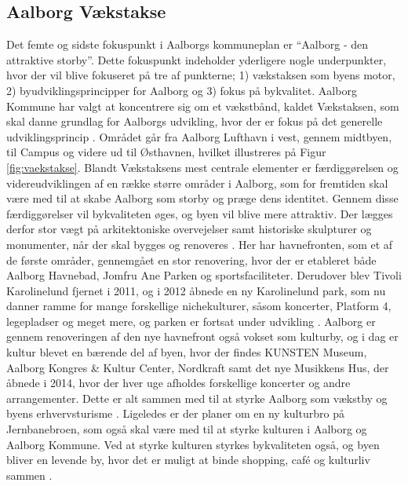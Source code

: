 \subsection{Aalborg Vækstakse}
Det femte og sidste fokuspunkt i Aalborgs kommuneplan er “Aalborg - den attraktive storby”. Dette fokuspunkt indeholder yderligere nogle underpunkter, hvor der vil blive fokuseret på tre af punkterne; 1) vækstaksen som byens motor, 2) byudviklingsprincipper for Aalborg og 3) fokus på bykvalitet. 
\newline
\newline
Aalborg Kommune har valgt at koncentrere sig om et vækstbånd, kaldet Vækstaksen, som skal danne grundlag for Aalborgs udvikling, hvor der er fokus på det generelle udviklingsprincip \citep{kommuneplan3}. Området går fra Aalborg Lufthavn i vest, gennem midtbyen, til Campus og videre ud til Østhavnen, hvilket illustreres på Figur \ref{fig:vaekstakse}. 
\newline \indent{     }  Blandt Vækstaksens mest centrale elementer er færdiggørelsen og videreudviklingen af en række større områder i Aalborg, som for fremtiden skal være med til at skabe Aalborg som storby og præge dens identitet. Gennem disse færdiggørelser vil bykvaliteten øges, og byen vil blive mere attraktiv. Der lægges derfor stor vægt på arkitektoniske overvejelser samt historiske skulpturer og monumenter, når der skal bygges og renoveres \citep{kommuneplan3}. 
\newline \indent{     }  Her har havnefronten, som et af de første områder, gennemgået en stor renovering, hvor der er etableret både Aalborg Havnebad, Jomfru Ane Parken og sportsfaciliteter. Derudover blev Tivoli Karolinelund fjernet i 2011, og i 2012 åbnede en ny Karolinelund park, som nu danner ramme for mange forskellige nichekulturer, såsom koncerter, Platform 4, legepladser og meget mere, og parken er fortsat under udvikling \citep{jomfruaneparken} \citep{karolinelund}. 
\newline \indent{     }  Aalborg er gennem renoveringen af den nye havnefront også vokset som kulturby, og i dag er kultur blevet en bærende del af byen, hvor der findes KUNSTEN Museum, Aalborg Kongres \& Kultur Center, Nordkraft samt det nye Musikkens Hus, der åbnede i 2014, hvor der hver uge afholdes forskellige koncerter og andre arrangementer. Dette er alt sammen med til at styrke Aalborg som vækstby og byens erhvervsturisme \citep{kommuneplan3}. Ligeledes er der planer om en ny kulturbro på Jernbanebroen, som også skal være med til at styrke kulturen i Aalborg og Aalborg Kommune. Ved at styrke kulturen styrkes bykvaliteten også, og byen bliver en levende by, hvor det er muligt at binde shopping, café og kulturliv sammen \citep{kulturbro} \citep{musikkenshus}.
